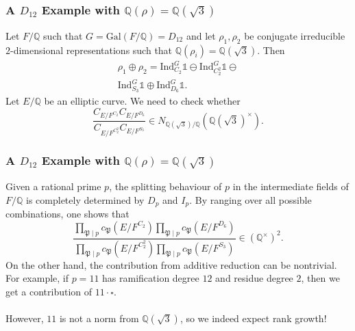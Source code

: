 \documentclass{beamer}
\newcommand{\Gal}{\mathrm{Gal}}
\newcommand{\Ind}{\mathrm{Ind}}
\newcommand{\QQss}{(\QQ^{\times})^2}
\newcommand{\PP}{\mathfrak{P}}
\newcommand{\QQ}{\mathbb{Q}}
\newcommand{\bQ}{\mathbb{Q}}
\theoremstyle{plain}
\begin{document}
\begin{frame}
    \frametitle{A $D_{12}$ Example with $\QQ(\rho)=\QQ(\sqrt{3})$}
    \begin{minipage}[t]{0.6\textwidth}
        Let $F/\QQ$ such that $G=\Gal(F/\QQ)=D_{12}$ and let $\rho_1,\rho_2$ be conjugate irreducible $2$-dimensional representations such that $\QQ(\rho_i)=\QQ(\sqrt{3})$. \pause Then 
        \begin{align*}
            \rho_1\oplus\rho_2=\Ind_{C_2}^{G}\mathds{1}\ominus\Ind_{C_2^2}^{G}\mathds{1}\ominus\\
            \Ind_{S_3}^{G}\mathds{1}\oplus\Ind_{D_6}^{G}\mathds{1}.
        \end{align*} \pause
        Let $E/\QQ$ be an elliptic curve. We need to check whether
        $$\frac{C_{E/F^{C_2}}C_{E/F^{D_6}}}{C_{E/F^{C_2^2}}C_{E/F^{S_3}}}\in N_{\bQ(\sqrt{3}) / \bQ}(\bQ(\sqrt{3})^{\times}).$$
    \end{minipage} \pause
    \begin{minipage}[t]{0.3\textwidth}
        \begin{figure}[!ht]
            \centering
        \end{figure}
    \end{minipage}
\end{frame}


\begin{frame}
    \frametitle{A $D_{12}$ Example with $\QQ(\rho)=\QQ(\sqrt{3})$}
    Given a rational prime $p$, the splitting behaviour of $p$ in the intermediate fields of $F/\QQ$ is completely determined by $D_p$ and $I_p$. \pause By ranging over all possible combinations, one shows that 
    $$\frac{\prod_{\PP\mid p}c_\PP(E/F^{C_2})\prod_{\PP\mid p}c_\PP(E/F^{D_6})}{\prod_{\PP\mid p}c_\PP(E/F^{C_2^2})\prod_{\PP\mid p}c_\PP(E/F^{S_3})}\in\QQss.$$
    \pause On the other hand, the contribution from additive reduction can be nontrivial. \pause For example, if $p=11$ has ramification degree $12$ and residue degree $2$, then we get a contribution of $11\cdot\square$. \pause
    \\~\\
    However, $11$ is not a norm from $\QQ(\sqrt{3})$, so we indeed expect rank growth!
\end{frame}
\end{document}
